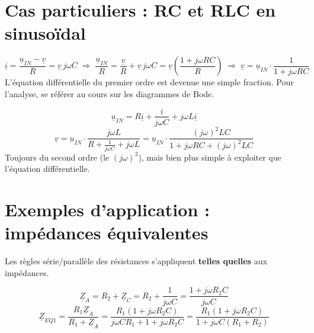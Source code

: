 \section{Cas particuliers : RC et RLC en sinusoïdal}


\begin{exbox}[title={RC : même démarche (Kirchhoff) que la diapositive 4}]
\[ \underline i = \frac{\underline u_{IN} - \underline v}{R} = \underline v\,j\omega C
   \;\Rightarrow\; \frac{\underline u_{IN}}{R} = \frac{\underline v}{R} + \underline v\,j\omega C
   = \underline v\left(\frac{1 + j\omega RC}{R}\right)
   \;\Rightarrow\; \underline v = \underline u_{IN}\cdot\frac1{1 + j\omega RC} \]
L'équation différentielle du premier ordre est devenue une simple fraction. Pour l'analyse,
se référer au cours sur les diagrammes de Bode.
\end{exbox}


\begin{exbox}[title={RLC série, sortie sur L}]
\[ \underline u_{IN} = R\underline i + \frac{\underline i}{j\omega C} + j\omega L\underline i \]
\[ \underline v = \underline u_{IN}\cdot\frac{j\omega L}{R + \frac1{j\omega C} + j\omega L}
   = \underline u_{IN}\cdot\frac{(j\omega)^2 LC}{1 + j\omega RC + (j\omega)^2 LC} \]
Toujours du second ordre (le $(j\omega)^2$), mais bien plus simple à exploiter que
l'équation différentielle.
\end{exbox}

\section{Exemples d'application : impédances équivalentes}


Les règles série/parallèle des résistances s'appliquent \textbf{telles quelles} aux
impédances.

\begin{exbox}[title={$\underline Z_{EQ1}$ : $R_1$ en parallèle avec ($R_2$ série C)}]
\[ \underline Z_A = R_2 + \underline Z_C = R_2 + \frac1{j\omega C} = \frac{1 + j\omega R_2C}{j\omega C} \]
\[ \underline Z_{EQ1} = \frac{R_1\underline Z_A}{R_1 + \underline Z_A}
   = \frac{R_1(1 + j\omega R_2C)}{j\omega C R_1 + 1 + j\omega R_2C}
   = \frac{R_1(1 + j\omega R_2C)}{1 + j\omega C(R_1 + R_2)} \]
\end{exbox}


